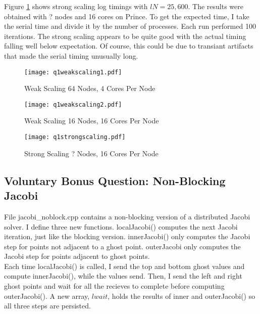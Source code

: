 \documentclass[10pt]{article}
\begin{document}
Figure \ref{fig2a} shows strong scaling log timings with $lN = 25,600$. The results were obtained with ? nodes and 16 cores on Prince. To get the expected time, I take the serial time and divide it by the number of processes. Each run performed 100 iterations. The strong scaling appears to be quite good with the actual timing falling well below expectation. Of course, this could be due to transiant artifacts that made the serial timing unusually long.

\lipsum

\begin{figure}[!h]
    \centering
    \begin{minipage}{0.45\textwidth}
        \centering
        \texttt{[image: q1weakscaling1.pdf]} %
        \caption{Weak Scaling 64 Nodes, 4 Cores Per Node}
        \label{fig1}
    \end{minipage}\hfill
         \begin{minipage}{0.45\textwidth}
        \centering
        \texttt{[image: q1weakscaling2.pdf]} %
        \caption{Weak Scaling 16 Nodes, 16 Cores Per Node}
        \label{fig2}
    \end{minipage}
     \begin{minipage}{0.45\textwidth}
        \centering
        \texttt{[image: q1strongscaling.pdf]} %
        \caption{Strong Scaling ? Nodes, 16 Cores Per Node}
        \label{fig2a}
    \end{minipage}
\end{figure}

\lipsum

\subsection{Voluntary Bonus Question: Non-Blocking Jacobi}

File jacobi\_noblock.cpp contains a non-blocking version of a distributed Jacobi solver. I define three new functions. localJacobi() computes the next Jacobi iteration, just like the blocking version. innerJacobi() only computes the Jacobi step for points not adjacent to a ghost point. outerJacobi only computes the Jacobi step for points adjacent to ghost points.\\

Each time localJacobi() is called, I send the top and bottom ghost values and compute innerJacobi(), while the values send. Then, I send the left and right ghost points and wait for all the recieves to complete before computing outerJacobi(). A new array, $lwait$, holds the results of inner and outerJacobi() so all three steps are persisted.\\
\end{document}
